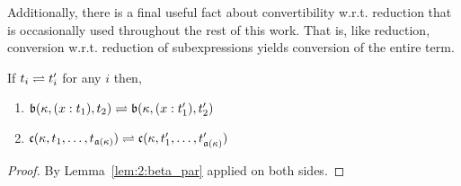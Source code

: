 Additionally, there is a final useful fact about convertibility w.r.t. reduction that is occasionally used throughout the rest of this work.
That is, like reduction, conversion w.r.t. reduction of subexpressions yields conversion of the entire term.

\begin{lemma}
    If $t_i \rightleftharpoons t_i^\prime$ for any $i$ then,
    \begin{enumerate}
        \item $\mathfrak{b}(\kappa, (x : t_1), t_2) \rightleftharpoons \mathfrak{b}(\kappa, (x : t_1^\prime), t_2^\prime)$
        \item $\mathfrak{c}(\kappa, t_1,\ldots,t_{\mathfrak{a}(\kappa)}) \rightleftharpoons \mathfrak{c}(\kappa, t_1^\prime,\ldots,t_{\mathfrak{a}(\kappa)}^\prime)$
    \end{enumerate}
    \label{lem:2:conv_congr}
\end{lemma}
\begin{proof}
    By Lemma~\ref{lem:2:beta_par} applied on both sides.
\end{proof}
